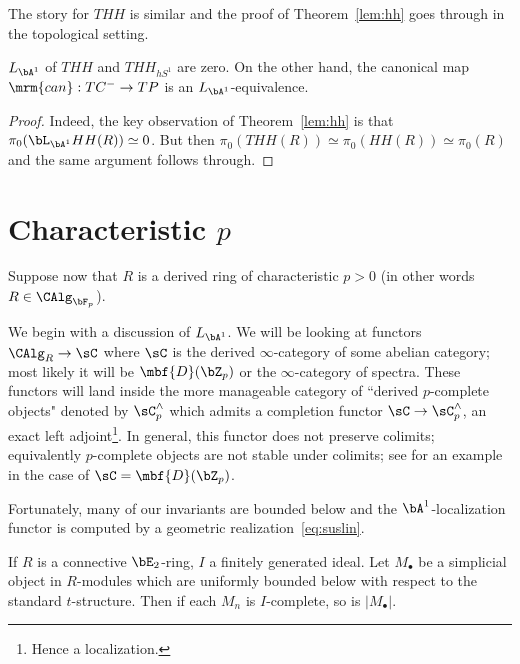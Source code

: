 \documentclass[a4paper,10pt]{amsart}
\begin{document}
 The story for $THH$ is similar and the proof of Theorem~\ref{lem:hh} goes through in the topological setting.

\begin{thm} \label{lem:thh} $L_{\bA^1}$ of $THH$ and $THH_{hS^1}$ are zero. On the other hand, the canonical map $\mrm{can}:TC^- \rightarrow TP$ is an $L_{\bA^1}$-equivalence.
\end{thm}

\begin{proof} Indeed, the key observation of Theorem~\ref{lem:hh} is that $\pi_0(\bL_{\bA^1}HH(R)) \simeq 0$. But then $\pi_0(THH(R)) \simeq \pi_0(HH(R)) \simeq \pi_0(R)$ and the same argument follows through.
\end{proof}

\section{Characteristic $p$}  \label{sect:charp}


Suppose now that $R$ is a derived ring of characteristic $p > 0$ (in other words $R \in \CAlg_{\bF_p}$). 

\sssec{} We begin with a discussion of $L_{\bA^1}$. We will be looking at functors $\CAlg_R \rightarrow \sC$ where $\sC$ is the derived $\infty$-category of some abelian category; most likely it will be $\mbf{D}(\bZ_p)$ or the $\infty$-category of spectra. These functors will land inside the more manageable category of ``derived $p$-complete objects" denoted by $\sC_p^{\comp}$ which admits a completion functor $\sC \rightarrow \sC_p^{\comp}$, an exact left adjoint\footnote{Hence a localization.}. In general, this functor does not preserve colimits; equivalently $p$-complete objects are not stable under colimits; see \cite[Tag 0ARC]{stacks} for an example in the case of $\sC = \mbf{D}(\bZ_p)$. 

\sssec{} Fortunately, many of our invariants are bounded below and the $\bA^1$-localization functor is computed by a geometric realization~\eqref{eq:suslin}. 

\begin{lem}\label{lem:geom-rel} If $R$ is a connective $\bE_2$-ring, $I$ a finitely generated ideal. Let $M_{\bullet}$ be a simplicial object in $R$-modules which are uniformly bounded below with respect to the standard $t$-structure. Then if each $M_n$ is $I$-complete, so is $|M_{\bullet}|$. 
\end{lem}
\end{document}
